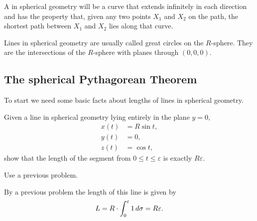 \documentclass[newpage,hints,handout,noauthor,nooutcomes,12pt]{ximera}
\begin{document}
\begin{definition}
A  in spherical geometry will be a curve that extends
infinitely in each direction and has the property that, given any two
points $X_{1}$ and $X_{2}$ on the path, the shortest path between
$X_{1}$ and $X_{2}$ lies along that curve.

Lines in spherical geometry are usually called great circles on the
$R$-sphere. They are the intersections of the $R$-sphere with planes
through $(0,0,0)$.
\end{definition}


\subsection{The spherical Pythagorean Theorem}

To start we need some basic facts about lengths of lines in spherical
geometry.



\begin{problem}
  Given a line in spherical geometry lying entirely in the plane $y=0$,
  \begin{align*}
    x(t) &= R\sin t,\\
    y(t) &= 0,\\
    z(t) &= \cos t,
  \end{align*}
  show that the length of the segment from $0 \leq t \leq \varepsilon$ is exactly $R\varepsilon$.
  \begin{hint}
    Use a previous problem.
  \end{hint}
  \begin{freeResponse}
    By a previous problem the length of this line is given by
    \[
    L=R \cdot \int_{0}^\varepsilon 1 \,d\sigma = R\varepsilon.
    \]
  \end{freeResponse}
\end{problem}
\end{document}
